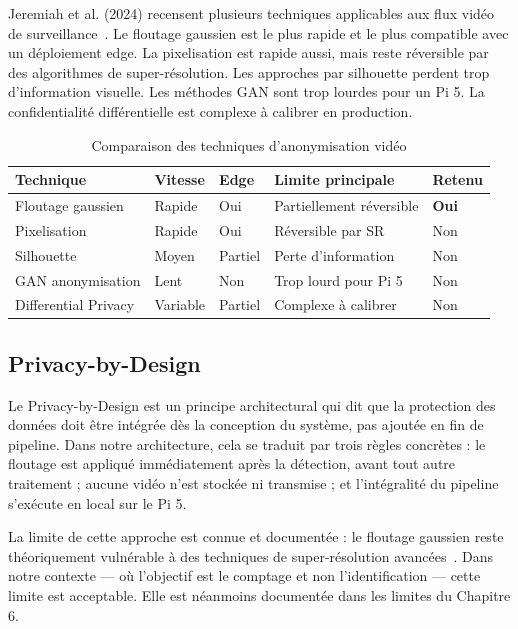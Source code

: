 Jeremiah et al. (2024) recensent plusieurs
techniques applicables aux flux vidéo de
surveillance~\cite{jeremiah2024}. Le floutage
gaussien est le plus rapide et le plus
compatible avec un déploiement edge. La
pixelisation est rapide aussi, mais reste
réversible par des algorithmes de
super-résolution. Les approches par
silhouette perdent trop d'information visuelle.
Les méthodes GAN sont trop lourdes pour un
Pi 5. La confidentialité différentielle est
complexe à calibrer en production.

\begin{table}[H]
\centering
\caption{Comparaison des techniques
         d'anonymisation vidéo}
\begin{tabularx}{\textwidth}{lllXl}
\toprule
\textbf{Technique} &
\textbf{Vitesse} &
\textbf{Edge} &
\textbf{Limite principale} &
\textbf{Retenu} \\
\midrule
Floutage gaussien &
Rapide & Oui &
Partiellement réversible &
\textbf{Oui} \\
Pixelisation &
Rapide & Oui &
Réversible par SR &
Non \\
Silhouette &
Moyen & Partiel &
Perte d'information &
Non \\
GAN anonymisation &
Lent & Non &
Trop lourd pour Pi 5 &
Non \\
Differential Privacy &
Variable & Partiel &
Complexe à calibrer &
Non \\
\bottomrule
\end{tabularx}
\label{tab:anon_techniques}
\end{table}

\subsection{Privacy-by-Design}

Le Privacy-by-Design est un principe
architectural qui dit que la protection des
données doit être intégrée dès la conception
du système, pas ajoutée en fin de pipeline.
Dans notre architecture, cela se traduit par
trois règles concrètes : le floutage est
appliqué immédiatement après la détection,
avant tout autre traitement ; aucune vidéo
n'est stockée ni transmise ; et l'intégralité
du pipeline s'exécute en local sur le Pi 5.

La limite de cette approche est connue et
documentée : le floutage gaussien reste
théoriquement vulnérable à des techniques
de super-résolution avancées~\cite{razi2025,
jeremiah2024}. Dans notre contexte — où
l'objectif est le comptage et non
l'identification — cette limite est
acceptable. Elle est néanmoins documentée
dans les limites du Chapitre 6.

